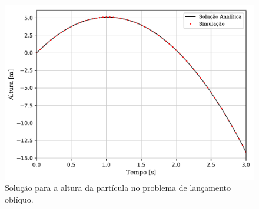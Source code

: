 \begin{figure}[h]
	\caption{Solução para a altura da partícula no problema de lançamento oblíquo\protect\footnotemark.}
	\begin{center}
		\includegraphics[scale=1]{images/falling_sphere/y_position.pdf}
	\end{center}
	\label{fig:falling_sphere_y_position}
	\sourceMe
\end{figure}


